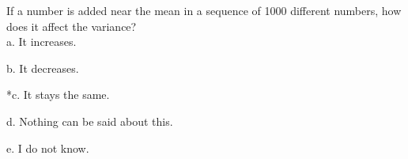 
If a number is added near the mean in a sequence of 1000 different
numbers, how does it affect the variance?\\

a. It increases.

b. It decreases.

*c. It stays the same.

d. Nothing can be said about this.

e. I do not know.\\
